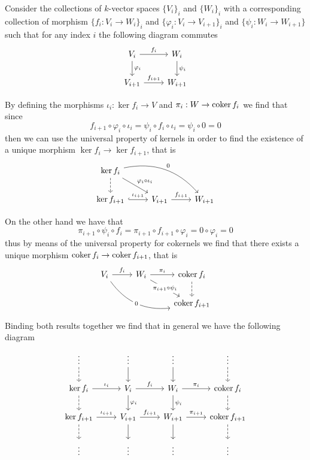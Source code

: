 Consider the collections of \(k\)-vector spaces \(\{V_i\}_i\) and \(\{W_i\}_i\)
with a corresponding collection of morphism \(\{f_i : V_i \to W_i\}_i\) and
\(\{\varphi_i : V_i \to V_{i+1}\}_i\) and \(\{\psi_i : W_i \to W_{i+1}\}\) such
that for any index \(i\) the following diagram commutes
\[
  \begin{tikzcd}
    V_i \rar["f_i"] \dar["\varphi_i"] &W_i \dar["\psi_i"] 
    \\
    V_{i+1} \rar["f_{i+1}"] &W_{i+1}
  \end{tikzcd}
\] 

By defining the morphisms \(\iota_i : \ker f_i \to V\) and \(\pi_i : W \to
\operatorname{coker} f_i\) we find that since 
\[
  f_{i+1} \circ \varphi_i \circ \iota_i 
  = \psi_i \circ f_i \circ \iota_i 
  = \psi_i \circ 0 = 0
\] 
then we can use the universal property of kernels in order to find the existence
of a unique morphism \(\ker f_i \to \ker f_{i+1}\), that is
\[
  \begin{tikzcd}
    \ker f_i \dar[dashed] \ar[dr, "\varphi_i \circ \iota_i"] \ar[drr, bend
    left, "0"] & &
    \\
    \ker f_{i+1} \rar[hook, "\iota_{i+1}"] &V_{i+1} \rar["f_{i+1}"] &W_{i+1}
  \end{tikzcd}
\] 

On the other hand we have that 
\[
  \pi_{i+1} \circ \psi_i \circ f_i 
  = \pi_{i+1} \circ f_{i+1} \circ \varphi_i 
  = 0 \circ \varphi_i = 0 
\] 
thus by means of the universal property for cokernels we find that there exists
a unique morphism \(\operatorname{coker} f_i \to \operatorname{coker} f_{i+1}\), that is
\[
  \begin{tikzcd}
    V_i \rar["f_i"] \ar[drr, bend right, "0" description] 
      &W_i \rar["\pi_i"] \ar[dr, "\pi_{i+1} \circ \psi_i" description]
    &\coker f_i \dar[dashed]
    \\
    & &\coker f_{i+1}
  \end{tikzcd}  
\] 

Binding both results together we find that in general we have the following
diagram
\[
  \begin{tikzcd}
    \vdots \dar[dashed] &\vdots \dar &\vdots \dar &\vdots \dar[dashed]
    \\
    \ker f_i \rar["\iota_i"] \dar[dashed]
      &V_i \rar["f_i"] \dar["\varphi_i"] 
    &W_i \dar["\psi_i"] \rar["\pi_i"] 
      &\coker f_i \dar[dashed]
    \\
    \ker f_{i+1} \rar["\iota_{i+1}"] \dar[dashed]
      &V_{i+1} \rar["f_{i+1}"] \dar
    &W_{i+1} \rar["\pi_{i+1}"] \dar
      &\coker f_{i+1} \dar[dashed]
    \\
    \vdots &\vdots &\vdots &\vdots
  \end{tikzcd}
\] 

